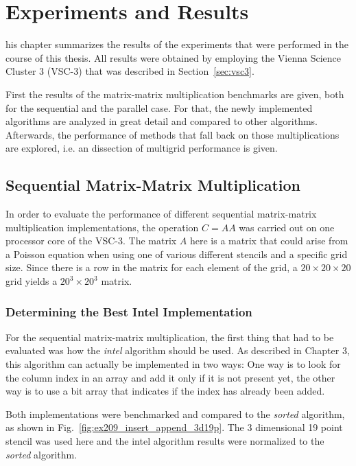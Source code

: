 \chapter{Experiments and Results}
his chapter summarizes the results of the experiments that were performed in the course of this thesis. All results were obtained by employing the Vienna Science Cluster 3 (VSC-3) that was described in Section~\ref{sec:vsc3}. 

First the results of the matrix-matrix multiplication benchmarks are given, both for the sequential and the parallel case. For that, the newly implemented algorithms are analyzed in great detail and compared to other algorithms. Afterwards, the performance of methods that fall back on those multiplications are explored, i.e. an dissection of multigrid performance is given.




\section{Sequential Matrix-Matrix Multiplication}

In order to evaluate the performance of different sequential matrix-matrix multiplication implementations, the operation $C = AA$ was carried out on one processor core of the VSC-3. The matrix $A$ here is a matrix that could arise from a Poisson equation when using one of various different stencils and a specific grid size. Since there is a row in the matrix for each element of the grid, a $20\times 20 \times 20$ grid yields a $20^3 \times 20^3$ matrix.

\subsection{Determining the Best Intel Implementation}
For the sequential matrix-matrix multiplication, the first thing that had to be evaluated was how the \textit{intel} algorithm should be used. As described in Chapter 3, this algorithm can actually be implemented in two ways: One way is to look for the column index in an array and add it only if it is not present yet, the other way is to use a bit array that indicates if the index has already been added. 

Both implementations were benchmarked and compared to the \textit{sorted} algorithm, as shown in Fig.~\ref{fig:ex209_insert_append_3d19p}. The 3 dimensional 19 point stencil was used here and the intel algorithm results were normalized to the \textit{sorted} algorithm. 

